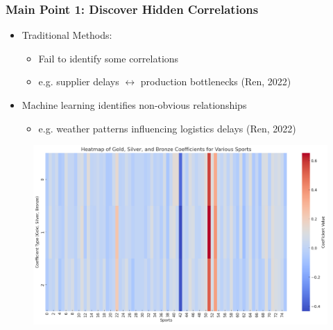 \documentclass{beamer}
\begin{document}
\begin{frame}
 \frametitle{Main Point 1: Discover Hidden Correlations}
\begin{minipage}{\textwidth}
{\linespread{1.5}
\begin{itemize}
    \item <1-> {\Large Traditional Methods:}
    \begin{itemize}
        \item {\large Fail to identify some correlations}
        \item {\large e.g. supplier delays $\leftrightarrow$ production bottlenecks} (Ren, 2022)
    \end{itemize}
    \item <2-> {\Large Machine learning identifies non-obvious relationships}
    \begin{itemize}
        \item {\large e.g. weather patterns influencing logistics delays} (Ren, 2022)
    \end{itemize}
\end{itemize}
}
\begin{figure}
    \centering
    \includegraphics[width=0.5\linewidth]{Heatmap.png}
    \label{fig:enter-label}
\end{figure}
\end{minipage}
\end{frame}
\end{document}

